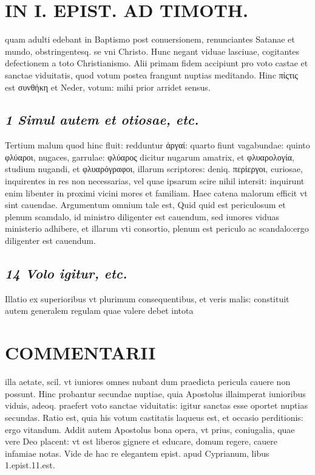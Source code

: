 \documentclass{article}
\begin{document}
\begin{pages}
\section*{IN I. EPIST. AD TIMOTH. }
\marginpar{[ p.129 ]}\pstart quam adulti edebant in Baptismo post conuersionem, renunciantes Satanae et mundo, obstringentesq. se vni Christo. Hunc negant viduae lasciuae, cogitantes defectionem a toto Christianismo. Alii primam fidem accipiunt pro voto castae et sanctae viduitatis, quod votum postea frangunt nuptias meditando. Hinc πίςτις est συνθήκη et Neder, votum: mihi prior arridet sensus.  \pend
{}
{}
\subsection*{\textit{1 Simul autem et otiosae, etc. }}\pstart Tertium malum quod hinc fluit: redduntur ἀργαί: quarto fiunt vagabundae: quinto φλύαροι, nugaces, garrulae: φλύαρος dicitur nugarum amatrix, et φλυαρολογία, studium nugandi, et φλυαρόγραφοι, illarum scriptores: deniq. περίεργοι, curiosae, inquirentes in res non necessarias, vel quae ipsarum scire nihil intersit: inquirunt enim libenter in proximi vicini mores et familiam. Haec catena malorum efficit vt sint cauendae. Argumentum omnium tale est, Quid quid est periculosum et plenum scamdalo, id ministro diligenter est cauendum, sed iunores viduas ministerio adhibere, et illarum vti consortio, plenum est periculo ac scandalo:ergo diligenter est cauendum.  \pend
{}
{}
\subsection*{\textit{14 Volo igitur, etc. }}\pstart Illatio ex superioribus  vt plurimum consequentibus, et veris malis: constituit autem generalem regulam quae valere debet intota  \pend
\section*{COMMENTARII }
\marginpar{[ p.130 ]}\pstart illa aetate, scil. vt iuniores omnes nubant dum praedicta pericula cauere non possunt. Hinc probantur secundae nuptiae, quia Apostolus illaimperat iunioribus  viduis, adeoq. praefert voto sanctae viduitatis: igitur sanctas esse oportet nuptias secundas. Ratio est, quia his votum castitatis laqueus est, et occasio perditionis: ergo vitandum. Addit autem Apostolus bona opera, vt prius, coniugalia, quae vere Deo placent: vt est liberos gignere et educare, domum regere, cauere infamiae notas. Vide de hac re elegantem epist. apud Cyprianum, libus 1.epist.11.est.  \pend
{}
{}

\end{pages}
\end{document}
